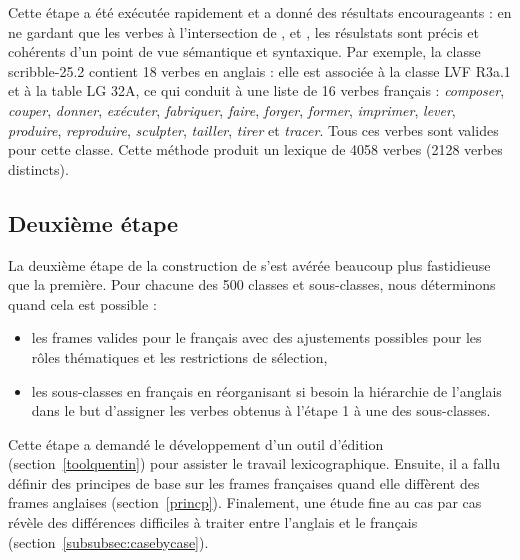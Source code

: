 Cette étape a été exécutée rapidement et a donné des résultats encourageants :
en ne gardant que les verbes à l'intersection de \Ltrad{}, \Clvf{} et \Clg{},
les résulstats sont précis et cohérents d'un point de vue sémantique et
syntaxique. Par exemple, la classe {\color{blue}scribble-25.2} contient 18
verbes en anglais : elle est associée à la classe LVF {\color{red}R3a.1} et à
la table LG {\color{green}32A}, ce qui conduit à une liste de 16 verbes
français : \emph{composer}, \emph{couper}, \emph{donner}, \emph{exécuter},
\emph{fabriquer}, \emph{faire}, \emph{forger}, \emph{former}, \emph{imprimer},
\emph{lever}, \emph{produire}, \emph{reproduire}, \emph{sculpter},
\emph{tailler}, \emph{tirer} et \emph{tracer}. Tous ces verbes sont valides
pour cette classe.  Cette méthode produit un lexique de 4058 verbes (2128
verbes distincts).


\subsection{Deuxième étape}\label{second}

La deuxième étape de la construction de \verbenet{} s'est avérée beaucoup plus
fastidieuse que la première. Pour chacune des 500 classes et sous-classes, nous
déterminons quand cela est possible :

\begin{itemize}

    \item les frames valides pour le français avec des ajustements possibles
        pour les rôles thématiques et les restrictions de sélection,

    \item les sous-classes en français en réorganisant si besoin la hiérarchie
        de l'anglais dans le but d'assigner les verbes obtenus à l'étape 1 à
        une des sous-classes.

\end{itemize}

Cette étape a demandé le développement d'un outil d'édition
(section~\ref{toolquentin}) pour assister le travail lexicographique. Ensuite,
il a fallu définir des principes de base sur les frames françaises quand elle
diffèrent des frames anglaises (section~\ref{princp}). Finalement, une étude
fine au cas par cas révèle des différences difficiles à traiter entre l'anglais
et le français (section~\ref{subsubsec:casebycase}).

